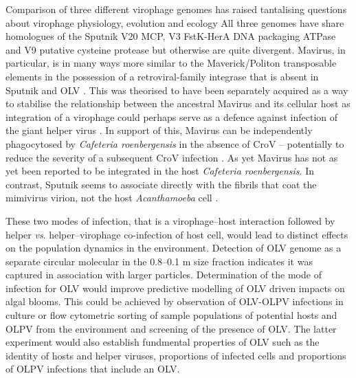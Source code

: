 Comparison of three different virophage genomes has raised tantalising questions about virophage physiology, evolution and ecology
All three genomes have share homologues of the Sputnik V20 \ac{MCP}, V3 FstK-HerA DNA packaging ATPase and V9 putative cysteine protease but otherwise are quite divergent.
Mavirus, in particular, is in many ways more similar to the Maverick/Politon transposable elements in the possession of a retroviral-family integrase that is absent in Sputnik and \ac{OLV} \cite{Fischer2011}.
This was theorised to have been separately acquired as a way to stabilise the relationship between the ancestral Mavirus and its cellular host as integration of a virophage could perhaps serve as a defence against infection of the giant helper virus \cite{Fischer2011}.
In support of this, Mavirus can be independently phagocytosed by \emph{Cafeteria roenbergensis} in the absence of \ac{CroV} -- potentially to reduce the severity of a subsequent \ac{CroV} infection \cite{Fischer2011}.
As yet Mavirus has not as yet been reported to be integrated in the host \emph{Cafeteria roenbergensis}.
In contrast, Sputnik seems to associate directly with the fibrils that coat the mimivirus virion, not the host \emph{Acanthamoeba} cell \cite{Boyer2011}.

These two modes of infection, that is a virophage--host interaction followed by helper \emph{vs}. helper--virophage co-infection of host cell, would lead to distinct effects on the population dynamics in the environment.
Detection of \ac{OLV} genome as a separate circular molecular in the 0.8--0.1 \textmu{}m size fraction indicates it was captured in association with larger particles.
Determination of the mode of infection for \ac{OLV} would improve predictive modelling of \ac{OLV} driven impacts on algal blooms.
This could be achieved by observation of \ac{OLV}-\ac{OLPV} infections in culture or flow cytometric sorting of sample populations of potential hosts and \ac{OLPV} from the environment and screening of the presence of \ac{OLV}.
The latter experiment would also establish fundmental properties of \ac{OLV} such as the identity of hosts and helper viruses, proportions of infected cells and proportions of \ac{OLPV} infections that include an \ac{OLV}.
 
